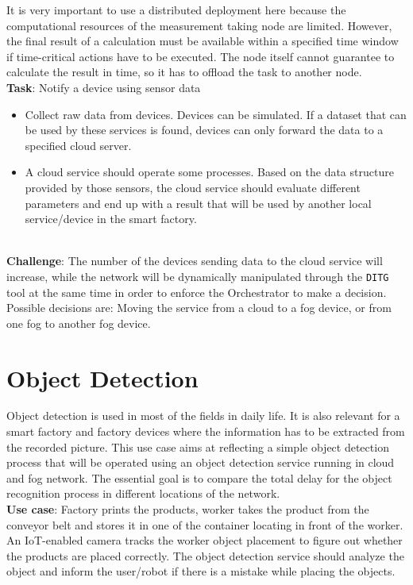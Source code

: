 It is very important to use a distributed deployment here because the computational resources of the measurement taking node are limited.
However, the final result of a calculation must be available within a specified time window if time-critical actions have to be executed.
The node itself cannot guarantee to calculate the result in time, so it has to offload the task to another node.\\

\textbf{Task}: Notify a device using sensor data
\begin{itemize}
    \item Collect raw data from devices. Devices can be simulated. If a dataset that can be used by these services is found, devices can only forward the data to a specified cloud server.
    \item A cloud service should operate some processes. Based on the data structure provided by those sensors, the cloud service should evaluate different parameters and end up with a result that will be used by another local service/device in the smart factory.
\end{itemize}
\\
\textbf{Challenge}: The number of the devices sending data to the cloud service will increase, while the network will be dynamically manipulated through the \texttt{DITG} tool at the same time in order to enforce the Orchestrator to make a decision.
Possible decisions are: Moving the service from a cloud to a fog device, or from one fog to another fog device.

\section{Object Detection}
Object detection is used in most of the fields in daily life.
It is also relevant for a smart factory and factory devices where the information has to be extracted from the recorded picture.
This use case aims at reflecting a simple object detection process that will be operated using an object detection service running in cloud and fog network.
The essential goal is to compare the total delay for the object recognition process in different locations of the network.\\

\textbf{Use case}: Factory prints the products, worker takes the product from the conveyor belt and stores it in one of the container locating in front of the worker.
An IoT-enabled camera tracks the worker object placement to figure out whether the products are placed correctly.
The object detection service should analyze the object and inform the user/robot if there is a mistake while placing the objects.\\

